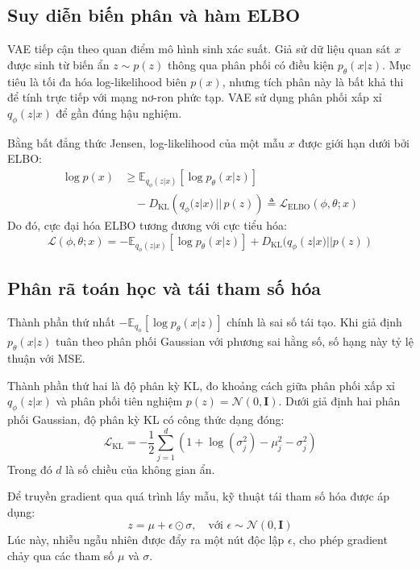 \documentclass[conference]{IEEEtran}
\begin{document}
\subsection{Suy diễn biến phân và hàm ELBO}
VAE tiếp cận theo quan điểm mô hình sinh xác suất. Giả sử dữ liệu quan sát \(x\) được sinh từ biến ẩn \(z \sim p(z)\) thông qua phân phối có điều kiện \(p_\theta(x|z)\). Mục tiêu là tối đa hóa log-likelihood biên \(p(x)\), nhưng tích phân này là bất khả thi để tính trực tiếp với mạng nơ-ron phức tạp. VAE sử dụng phân phối xấp xỉ \(q_\phi(z|x)\) để gần đúng hậu nghiệm.

Bằng bất đẳng thức Jensen, log-likelihood của một mẫu \(x\) được giới hạn dưới bởi ELBO:
\begin{align}
\log p(x) &\ge \mathbb{E}_{q_\phi(z|x)}[\log p_\theta(x|z)] \nonumber \\
&\quad - D_{\text{KL}}\left(q_\phi(z|x) \,||\, p(z)\right) \triangleq \mathcal{L}_{\text{ELBO}}(\phi, \theta; x)
\end{align}
Do đó, cực đại hóa ELBO tương đương với cực tiểu hóa:
\begin{equation}
\mathcal{L}(\phi, \theta; x) = -\mathbb{E}_{q_\phi(z|x)}[\log p_\theta(x|z)] + D_{\text{KL}}(q_\phi(z|x) || p(z))
\end{equation}

\subsection{Phân rã toán học và tái tham số hóa}
Thành phần thứ nhất \(-\mathbb{E}_{q_\phi}[\log p_\theta(x|z)]\) chính là sai số tái tạo. Khi giả định \(p_\theta(x|z)\) tuân theo phân phối Gaussian với phương sai hằng số, số hạng này tỷ lệ thuận với MSE.

Thành phần thứ hai là độ phân kỳ KL, đo khoảng cách giữa phân phối xấp xỉ \(q_\phi(z|x)\) và phân phối tiên nghiệm \(p(z) = \mathcal{N}(0, \mathbf{I})\). Dưới giả định hai phân phối Gaussian, độ phân kỳ KL có công thức dạng đóng:
\begin{equation}
\mathcal{L}_{\text{KL}} = -\frac{1}{2} \sum_{j=1}^{d} \left( 1 + \log(\sigma_j^2) - \mu_j^2 - \sigma_j^2 \right)
\end{equation}
Trong đó \(d\) là số chiều của không gian ẩn.

Để truyền gradient qua quá trình lấy mẫu, kỹ thuật tái tham số hóa được áp dụng:
\begin{equation}
z = \mu + \epsilon \odot \sigma, \quad \text{với } \epsilon \sim \mathcal{N}(0, \mathbf{I})
\end{equation}
Lúc này, nhiễu ngẫu nhiên được đẩy ra một nút độc lập \(\epsilon\), cho phép gradient chảy qua các tham số \(\mu\) và \(\sigma\).
\end{document}
